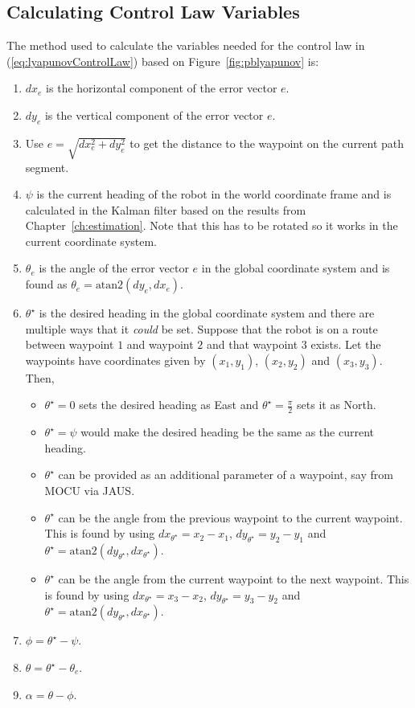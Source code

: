 \subsection{Calculating Control Law Variables}%
\label{sec:lyapunovVariables}
The method used to calculate the variables needed for the control law in (\ref{eq:lyapunovControlLaw}) based on Figure~\ref{fig:pblyapunov} is:
\begin{enumerate}
\item $dx_e$ is the horizontal component of the error vector $e$.
\item $dy_e$ is the vertical component of the error vector $e$.
\item Use $e = \sqrt{dx_e^2 + dy_e^2}$ to get the distance to the waypoint on the current path segment.
\item $\psi$ is the current heading of the robot in the world coordinate frame and is calculated in the Kalman filter based on the results from Chapter~\ref{ch:estimation}. Note that this has to be rotated so it works in the current coordinate system.
\item $\theta_e$ is the angle of the error vector $e$ in the global coordinate system and is found as $\theta_e = \text{atan2}(dy_e,dx_e)$.
\item $\theta^\star$ is the desired heading in the global coordinate system and there are multiple ways that it \textit{could} be set. Suppose that the robot is on a route between waypoint $1$ and waypoint $2$ and that waypoint $3$ exists. Let the waypoints have coordinates given by $(x_1,y_1)$, $(x_2,y_2)$ and $(x_3,y_3)$. Then,
\begin{itemize}
\item $\theta^\star=0$ sets the desired heading as East and $\theta^\star=\frac{\pi}{2}$ sets it as North.
\item $\theta^\star=\psi$ would make the desired heading be the same as the current heading.
\item $\theta^\star$ can be provided as an additional parameter of a waypoint, say from MOCU via JAUS\@.
\item $\theta^\star$ can be the angle from the previous waypoint to the current waypoint. This is found by using $dx_{\theta^\star}=x_2-x_1$, $dy_{\theta^\star}=y_2-y_1$ and $\theta^\star=\text{atan2}(dy_{\theta^\star},dx_{\theta^\star})$.
\item $\theta^\star$ can be the angle from the current waypoint to the next waypoint. This is found by using $dx_{\theta^\star}=x_3-x_2$, $dy_{\theta^\star}=y_3-y_2$ and $\theta^\star=\text{atan2}(dy_{\theta^\star},dx_{\theta^\star})$.
\end{itemize}
\item $\phi=\theta^\star-\psi$.
\item $\theta=\theta^\star - \theta_e$.
\item $\alpha = \theta - \phi$.
\end{enumerate}

